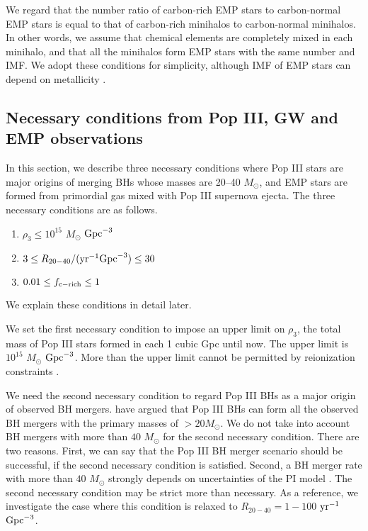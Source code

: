 \documentclass[pdftex]{pasj01}
\newcommand{\msun}{M_\odot}
\newcommand{\pyr}{{\rm yr}^{-1}}
\newcommand{\cgpc}{{\rm Gpc}^{-3}}
\newcommand{\dthree}{\rho_{3}}
\newcommand{\ratetarget}{R_{20-40}}
\newcommand{\fcemp}{f_{\rm c-rich}}
\begin{document}
We regard that the number ratio of carbon-rich EMP stars to
carbon-normal EMP stars is equal to that of carbon-rich minihalos to
carbon-normal minihalos. In other words, we assume that chemical
elements are completely mixed in each minihalo, and that all the
minihalos form EMP stars with the same number and IMF. We adopt these
conditions for simplicity, although IMF of EMP stars can depend on
metallicity \citep{2000ApJ...534..809O, 2003Natur.422..869S,
  2013ApJ...766..103D, 2016MNRAS.463.2781C, 2021MNRAS.508.4175C}.

\subsection{Necessary conditions from Pop III, GW and EMP observations}
\label{sec:NecessaryConditions}

In this section, we describe three necessary conditions where Pop III
stars are major origins of merging BHs whose masses are 20--40
$\msun$, and EMP stars are formed from primordial gas mixed with Pop
III supernova ejecta. The three necessary conditions are as follows.
\begin{enumerate}
\item $\dthree \le 10^{15}$ $\msun$ $\cgpc$
\item $3 \le \ratetarget/(\pyr \cgpc) \le 30$
\item $0.01 \le \fcemp \le 1 $
\end{enumerate}
We explain these conditions in detail later.

We set the first necessary condition to impose an upper limit on
$\dthree$, the total mass of Pop III stars formed in each 1 cubic Gpc
until now. The upper limit is $10^{15}$ $\msun$ $\cgpc$. More than the
upper limit cannot be permitted by reionization constraints
\citep{2016MNRAS.461.2722I, 2021ApJ...919...41I}.

We need the second necessary condition to regard Pop III BHs as a
major origin of observed BH mergers. \citet{2021MNRAS.504L..28K} have
argued that Pop III BHs can form all the observed BH mergers with the
primary masses of $> 20 \msun$. We do not take into account BH mergers
with more than $40$ $\msun$ for the second necessary condition. There
are two reasons. First, we can say that the Pop III BH merger scenario
should be successful, if the second necessary condition is
satisfied. Second, a BH merger rate with more than $40$ $\msun$
strongly depends on uncertainties of the PI model
\citep{2020ApJ...902L..36F, 2020ApJ...905L..15B,
  2021MNRAS.501.4514C}. The second necessary condition may be strict
more than necessary. As a reference, we investigate the case where
this condition is relaxed to $\ratetarget = 1-100$ $\pyr$ $\cgpc$.
\end{document}
